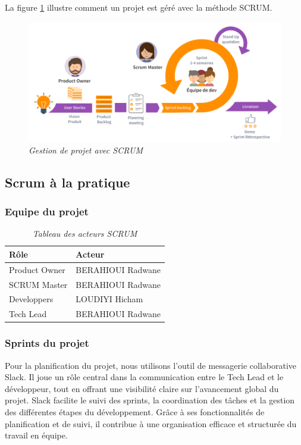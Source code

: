 \documentclass[12pt,a4paper]{report}
\begin{document}
	La figure \ref{fig:scrum} illustre comment un projet est géré avec la méthode SCRUM.
	
	\begin{figure}[H]
		\centering
		\includegraphics[width=1\textwidth]{scrum.png}
		\caption{\textit{Gestion de projet avec SCRUM}}
		\label{fig:scrum}
	\end{figure}
	
	\subsection{Scrum à la pratique}
	
	\subsubsection{Equipe du projet}
	
	\begin{table}[H]
		\centering
		\caption{\textit{Tableau des acteurs SCRUM}}
		\begin{tabular}{|l|l|}
			\hline
			\textbf{Rôle} & \textbf{Acteur} \\
			\hline
			Product Owner & BERAHIOUI Radwane \\
			\hline
			SCRUM Master & BERAHIOUI Radwane \\
			\hline
			Developpers & LOUDIYI Hicham \\
			\hline
			Tech Lead & BERAHIOUI Radwane \\
			\hline
		\end{tabular}
		\label{tab:equipe-projet}
	\end{table}
	
	\subsubsection{Sprints du projet}
	
	Pour la planification du projet, nous utilisons l’outil de messagerie collaborative Slack. Il joue un rôle central dans la communication entre le Tech Lead et le développeur, tout en offrant une visibilité claire sur l’avancement global du projet. Slack facilite le suivi des sprints, la coordination des tâches et la gestion des différentes étapes du développement. Grâce à ses fonctionnalités de planification et de suivi, il contribue à une organisation efficace et structurée du travail en équipe.
	
\end{document}
